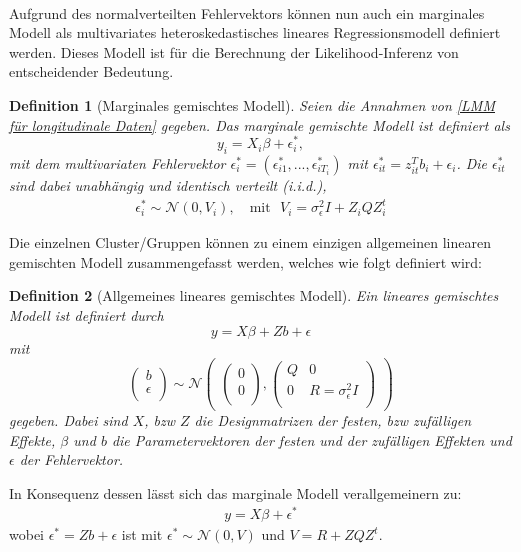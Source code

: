 \documentclass[%
thesis=student,%
coverpage=false,%
titlepage=false,%
headmarks=true, %
german,%
font=libertine, %
math=newpxtx, %
BCOR=5mm,%
coverBCOR=11mm%
]{tumbook}
\theoremstyle{break}
\newtheorem{definition}{Definition}[section]
\begin{document}
\\
Aufgrund des normalverteilten Fehlervektors können nun auch ein marginales Modell als multivariates heteroskedastisches lineares Regressionsmodell definiert werden. Dieses Modell ist für die Berechnung der Likelihood-Inferenz von entscheidender Bedeutung. 
\begin{definition}[Marginales gemischtes Modell]
	Seien die Annahmen von \ref{LMM für longitudinale Daten} gegeben. 
	Das marginale gemischte Modell ist definiert als
	$$ y_i = X_i\beta + \epsilon_i^*,$$
	mit dem multivariaten Fehlervektor $\epsilon_i^* = (\epsilon_{i1}^*,...,\epsilon_{iT_i}^*) $ mit $\epsilon_{it}^* = z_{it}^Tb_i + \epsilon_i$. 
	Die $\epsilon_{it}^*$ sind dabei unabhängig und identisch verteilt (i.i.d.),
	\begin{align}
		\epsilon_i^* \sim \mathcal{N}(0,V_i), \hspace{12pt}\text{mit} \hspace{8pt}V_i = \sigma_\epsilon^2I + Z_i Q Z_i^t 
	\end{align}
\end{definition} \noindent
Die einzelnen Cluster/Gruppen können zu einem einzigen allgemeinen linearen gemischten Modell zusammengefasst werden, welches wie folgt definiert wird:
\begin{definition}[Allgemeines lineares gemischtes Modell]
	Ein lineares gemischtes Modell ist definiert durch
	$$y = X\beta + Zb + \epsilon $$
	mit $$\begin{pmatrix}
		b \\
		\epsilon \\
	\end{pmatrix}
	\sim
	\mathcal{N}
	\begin{pmatrix}
		\begin{pmatrix}
			
			0 \\
			0 \\
		\end{pmatrix},
		\begin{pmatrix}
			Q & 0 \\
			0 & R = \sigma_\epsilon^2I \\
		\end{pmatrix}
	\end{pmatrix}$$
	gegeben. Dabei sind $X$, bzw $Z$ die Designmatrizen der festen, bzw zufälligen Effekte, $\beta$ und $b$ die Parametervektoren der festen und der zufälligen Effekten und $\epsilon$ der Fehlervektor.
\end{definition}\noindent
In Konsequenz dessen lässt sich das marginale Modell verallgemeinern zu: 
\begin{align}	
	y = X\beta + \epsilon^* \label{marginales Modell}
\end{align}
wobei $\epsilon^* = Zb + \epsilon$ ist mit $\epsilon^* \sim \mathcal{N}(0,V)$ und $V= R + ZQZ^t$.
\end{document}
